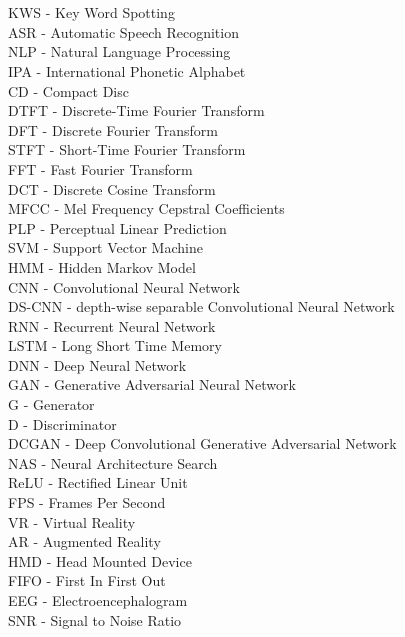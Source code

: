 
\chapter*{}
KWS - Key Word Spotting\\
ASR - Automatic Speech Recognition\\
NLP - Natural Language Processing\\
IPA - International Phonetic Alphabet\\
CD - Compact Disc\\
%
DTFT - Discrete-Time Fourier Transform\\
DFT - Discrete Fourier Transform\\
STFT - Short-Time Fourier Transform\\
FFT - Fast Fourier Transform\\
DCT - Discrete Cosine Transform\\
MFCC - Mel Frequency Cepstral Coefficients\\
PLP - Perceptual Linear Prediction\\
%
SVM - Support Vector Machine\\
HMM - Hidden Markov Model\\
%
CNN - Convolutional Neural Network\\
DS-CNN - depth-wise separable Convolutional Neural Network\\
RNN - Recurrent Neural Network\\
LSTM - Long Short Time Memory\\
DNN - Deep Neural Network\\
GAN - Generative Adversarial Neural Network\\
G - Generator\\
D - Discriminator\\
DCGAN - Deep Convolutional Generative Adversarial Network\\
NAS - Neural Architecture Search\\
ReLU - Rectified Linear Unit\\
%
FPS - Frames Per Second\\
VR - Virtual Reality\\
AR - Augmented Reality\\
HMD - Head Mounted Device\\
%
FIFO - First In First Out\\
%
EEG - Electroencephalogram\\
SNR - Signal to Noise Ratio\\